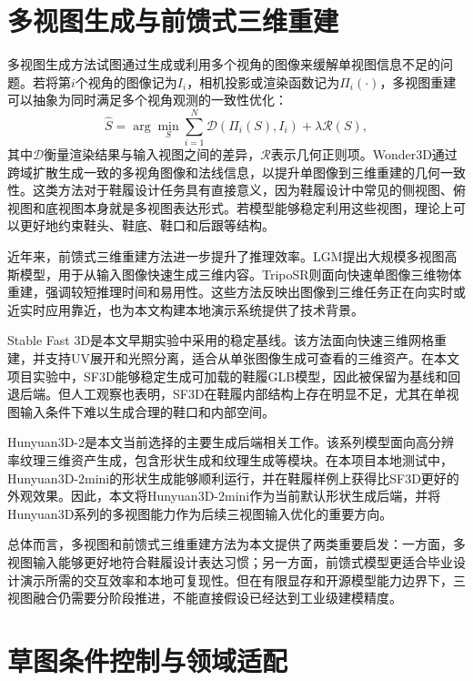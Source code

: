 \section{多视图生成与前馈式三维重建}

多视图生成方法试图通过生成或利用多个视角的图像来缓解单视图信息不足的问题。若将第$i$个视角的图像记为$I_i$，相机投影或渲染函数记为$\Pi_i(\cdot)$，多视图重建可以抽象为同时满足多个视角观测的一致性优化：
\begin{equation}
  \hat{S} = \arg\min_S
  \sum_{i=1}^{N} \mathcal{D}\left(\Pi_i(S), I_i\right)
  + \lambda\mathcal{R}(S),
  \label{eq:multiview-consistency}
\end{equation}
其中$\mathcal{D}$衡量渲染结果与输入视图之间的差异，$\mathcal{R}$表示几何正则项。Wonder3D通过跨域扩散生成一致的多视角图像和法线信息，以提升单图像到三维重建的几何一致性\citep{long2023wonder3d}。这类方法对于鞋履设计任务具有直接意义，因为鞋履设计中常见的侧视图、俯视图和底视图本身就是多视图表达形式。若模型能够稳定利用这些视图，理论上可以更好地约束鞋头、鞋底、鞋口和后跟等结构。

近年来，前馈式三维重建方法进一步提升了推理效率。LGM提出大规模多视图高斯模型，用于从输入图像快速生成三维内容\citep{tang2024lgm}。TripoSR则面向快速单图像三维物体重建，强调较短推理时间和易用性\citep{tochilkin2024triposr}。这些方法反映出图像到三维任务正在向实时或近实时应用靠近，也为本文构建本地演示系统提供了技术背景。

Stable Fast 3D是本文早期实验中采用的稳定基线。该方法面向快速三维网格重建，并支持UV展开和光照分离，适合从单张图像生成可查看的三维资产\citep{boss2024sf3d}。在本文项目实验中，SF3D能够稳定生成可加载的鞋履GLB模型，因此被保留为基线和回退后端。但人工观察也表明，SF3D在鞋履内部结构上存在明显不足，尤其在单视图输入条件下难以生成合理的鞋口和内部空间。

Hunyuan3D-2是本文当前选择的主要生成后端相关工作。该系列模型面向高分辨率纹理三维资产生成，包含形状生成和纹理生成等模块\citep{hunyuan3d2025hunyuan3d2}。在本项目本地测试中，Hunyuan3D-2mini的形状生成能够顺利运行，并在鞋履样例上获得比SF3D更好的外观效果。因此，本文将Hunyuan3D-2mini作为当前默认形状生成后端，并将Hunyuan3D系列的多视图能力作为后续三视图输入优化的重要方向。

总体而言，多视图和前馈式三维重建方法为本文提供了两类重要启发：一方面，多视图输入能够更好地符合鞋履设计表达习惯；另一方面，前馈式模型更适合毕业设计演示所需的交互效率和本地可复现性。但在有限显存和开源模型能力边界下，三视图融合仍需要分阶段推进，不能直接假设已经达到工业级建模精度。

\section{草图条件控制与领域适配}

